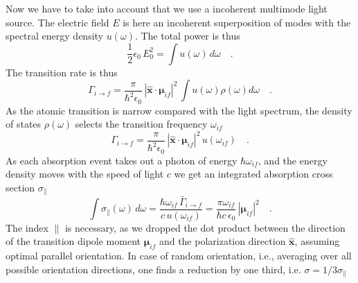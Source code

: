 Now we have to take into account that we use a incoherent multimode light source. The electric field $E$ is here an incoherent superposition of  modes with the  spectral energy density $u(\omega)$.
The total power is thus
\begin{equation}
 \frac{1}{2} \epsilon_0  \, E_0^2  = \int  u(\omega)  \, d\omega \quad .
\end{equation}
The  transition rate is thus 
\begin{equation}
 \Gamma_{i \rightarrow f} =   \frac{\pi  }{\hbar^2 \epsilon_0}  \, |\mathbf{\hat{x}} \cdot \mathbf{\mu}_{if} |^2 \,
\int u(\omega)  
  \rho(\omega)  d \omega \quad .
\end{equation}
As the atomic transition is narrow compared with the light spectrum, the density of states $\rho(\omega)$ selects the transition frequency $\omega_{if}$ 
\begin{equation}
 \Gamma_{i \rightarrow f} =   \frac{\pi  }{\hbar^2 \epsilon_0}  \, |\mathbf{\hat{x}} \cdot \mathbf{\mu}_{if} |^2 \,
 u(\omega_{if})   \quad .
\end{equation}
As each absorption event takes out a photon of energy $\hbar \omega_{if}$, and the energy density moves with the speed of light $c$ we get an integrated absorption cross section $\sigma_{\parallel}$ 
\begin{equation}
 \int \sigma_{\parallel}(\omega) \, d \omega = \frac{ \hbar \omega_{if} \, \bar{\Gamma}_{i \rightarrow f} }{c \, u(\omega_{if})}  = 
  \frac{\pi \omega_{if}}{ \hbar c \, \epsilon_0} \,
 |\mathbf{\mu}_{if} |^2  \quad . \label{eq:abs_sigma_mu}
\end{equation}
The index ${\parallel} $ is necessary, as we dropped the dot product between the direction of the transition dipole moment $\mathbf{\mu}_{if}$ and the polarization direction $\mathbf{\hat{x}}$, assuming optimal parallel orientation. In case of random orientation, i.e., averaging over all possible orientation directions, one finds  a reduction by one third, i.e. $\sigma = 1/3 \sigma_{\parallel} $

